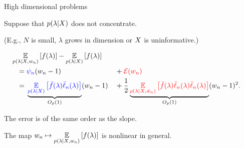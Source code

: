 \begin{frame}{High dimensional problems}

\spskip

Suppose that $p(\lambda \vert X)$ does not concentrate.

(E.g., $N$ is small, $\lambda$ grows in dimension or $X$ is uninformative.)

\pause

\begin{align*}
%
\MoveEqLeft
\expect{\p(\lambda \vert \xvec, \w_n)}{f(\lambda)} -
\expect{\p(\lambda \vert \xvec)}{f(\lambda)}
\\={}&
\blue{\infl_n} (\w_n - 1)
&&
+ \red{\err(\w_n)}
\\={}&
\undernote{
\blue{\expect{\p(\lambda \vert \xvec)}
             {\fbar(\lambda) \ellbar_n(\lambda)}}
}{O_p(1)}
(\w_n - 1)
&&
+ \frac{1}{2}
\undernote{
\red{
\expect{\p(\lambda \vert \xvec, \wtil_n)}{
    \fbar(\lambda)
    \ellbar_n(\lambda)
    \ellbar_n(\lambda)}
}
}{O_p(1)}
(\w_n - 1)^2.
%
\end{align*}

The error is of the same order as the slope.

The map
$w_n \mapsto \underset{p(\lambda \vert X, w_n)}{\mathbb{E}}\left[f(\lambda)\right]$ is nonlinear in general.

\pause
\spskip
{}


%
\end{frame}



